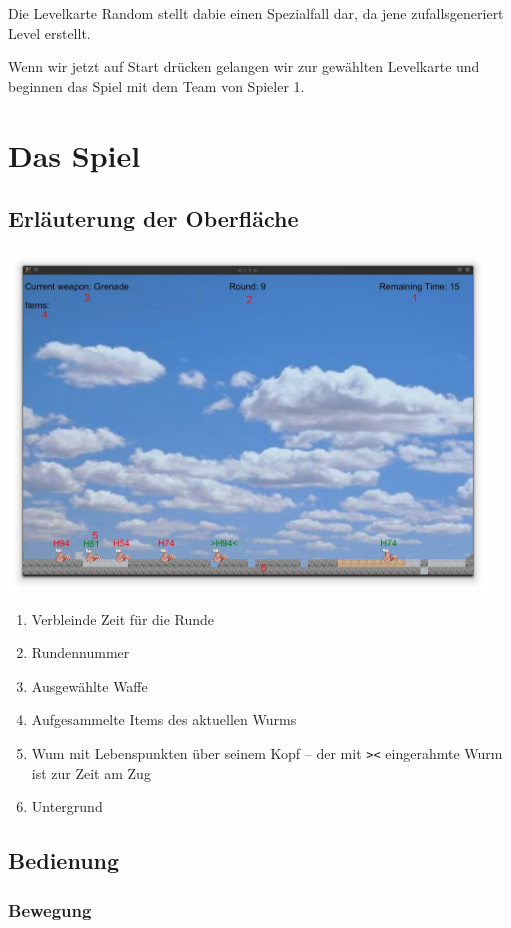 \documentclass{scrreprt}
\begin{document}
Die Levelkarte Random stellt dabie einen Spezialfall dar, da jene zufallsgeneriert Level erstellt.

Wenn wir jetzt auf Start drücken gelangen wir zur gewählten Levelkarte und beginnen das Spiel
mit dem Team von Spieler 1.

\section{Das Spiel}

\subsection{Erläuterung der Oberfläche}

\includegraphics[height=9cm]{Screenshot13.jpg}

\begin{enumerate}
 \item Verbleinde Zeit für die Runde
 \item Rundennummer
 \item Ausgewählte Waffe
 \item Aufgesammelte Items des aktuellen Wurms
 \item Wum mit Lebenspunkten über seinem Kopf – der mit \texttt{><} eingerahmte Wurm ist zur Zeit am Zug
 \item Untergrund
\end{enumerate}

\subsection{Bedienung}

\subsubsection{Bewegung}
\end{document}
